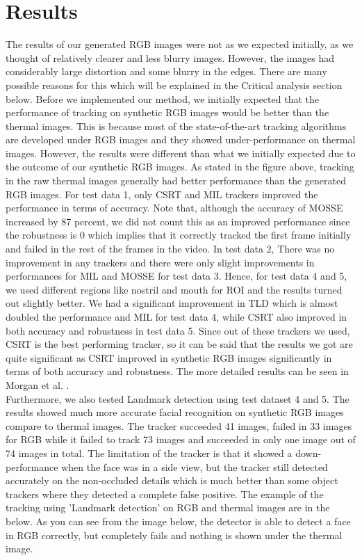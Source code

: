 \documentclass[conference]{IEEEtran}
\begin{document}
\section{Results}
The results of our generated RGB images were not as we expected initially, as we thought of relatively clearer and less blurry images. However, the images had considerably large distortion and some blurry in the edges. There are many possible reasons for this which will be explained in the Critical analysis section below.
Before we implemented our method, we initially expected that the performance of tracking on synthetic RGB images would be better than the thermal images. This is because most of the state-of-the-art tracking algorithms are developed under RGB images and they showed under-performance on thermal images. However, the results were different than what we initially expected due to the outcome of our synthetic RGB images. As stated in the figure above, tracking in the raw thermal images generally had better performance than the generated RGB images. For test data 1, only CSRT and MIL trackers improved the performance in terms of accuracy. Note that, although the accuracy of MOSSE increased by 87 percent, we did not count this as an improved performance since the robustness is 0 which implies that it correctly tracked the first frame initially and failed in the rest of the frames in the video. In test data 2, There was no improvement in any trackers and there were only slight improvements in performances for MIL and MOSSE for test data 3. Hence, for test data 4 and 5, we used different regions like nostril and mouth for ROI and the results turned out slightly better. We had a significant improvement in TLD which is almost doubled the performance and MIL for test data 4, while CSRT also improved in both accuracy and robustness in test data 5. Since out of these trackers we used, CSRT is the best performing tracker, so it can be said that the results we got are quite significant as CSRT improved in synthetic RGB images significantly in terms of both accuracy and robustness. The more detailed results can be seen in Morgan et al. \cite{b20}.\\
Furthermore, we also tested Landmark detection using test dataset 4 and 5. The results showed much more accurate facial recognition on synthetic RGB images compare to thermal images. The tracker succeeded 41 images, failed in 33 images for RGB while it failed to track 73 images and succeeded in only one image out of 74 images in total. The limitation of the tracker is that it showed a down-performance when the face was in a side view, but the tracker still detected accurately on the non-occluded details which is much better than some object trackers where they detected a complete false positive. The example of the tracking using 'Landmark detection' \cite{b21} on RGB and thermal images are in the below. As you can see from the image below, the detector is able to detect a face in RGB correctly, but completely fails and nothing is shown under the thermal image.
\end{document}
